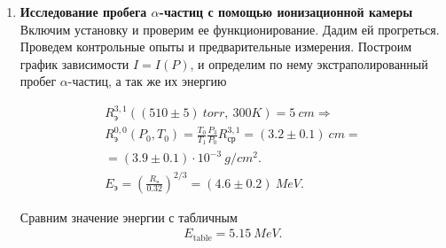 \begin{enumerate}

\item
\textbf{Исследование пробега $\alpha$-частиц с помощью ионизационной камеры}\\
Включим установку и проверим ее функционирование. Дадим ей прогреться. Проведем контрольные опыты и предварительные измерения. 
Построим график зависимости $I=I(P)$, и определим по нему экстраполированный пробег $\alpha$-частиц, а так же их энергию

\begin{gather*}
R_{\text{э}}^{3, 1}((510 \pm 5)~torr,~300K) = 5~cm \Rightarrow\\
R_{\text{э}}^{0, 0}(P_0, T_0) = \frac{T_0}{T_1} \frac{P_3}{P_0}R_{\text{ср}}^{3, 1} = (3.2 \pm 0.1)~cm =\\
= (3.9\pm0.1)\cdot10^{-3}~g/cm^2.\\
E_{\text{э}} = \left( \frac{R_{\text{э}}}{0.32} \right)^{2/3} = (4.6 \pm 0.2)~MeV.
\end{gather*}

\begin{figure}[h]
\end{figure}

Сравним значение энергии с табличным
\begin{gather*}
E_{\text{table}} = 5.15~MeV.
\end{gather*}

\end{enumerate}

